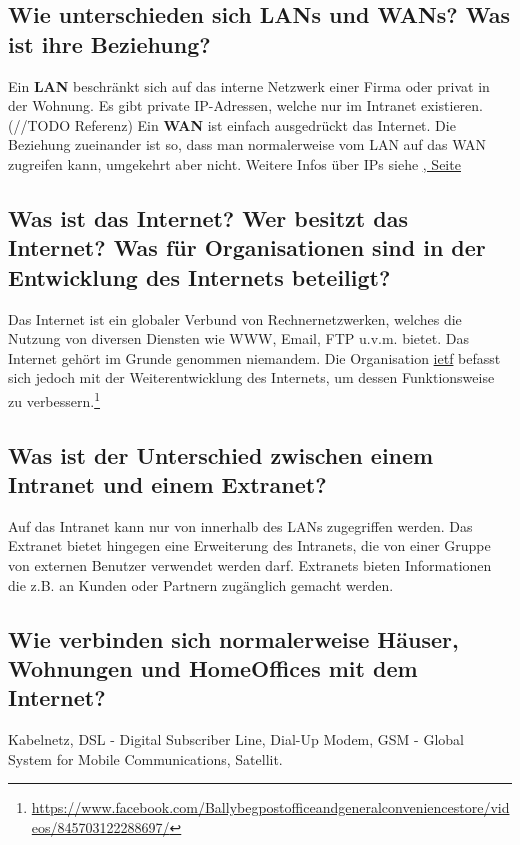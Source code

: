 \subsection*{Wie unterschieden sich LANs und WANs? Was ist ihre Beziehung?}
Ein \textbf{LAN} beschränkt sich auf das interne Netzwerk einer Firma oder privat in der Wohnung. Es gibt private IP-Adressen, welche nur im Intranet existieren. (//TODO Referenz) Ein \textbf{WAN} ist einfach ausgedrückt das Internet. Die Beziehung zueinander ist so, dass man normalerweise vom LAN auf das WAN zugreifen kann, umgekehrt aber nicht. Weitere Infos über IPs siehe \hyperref[part:sw0506]{\underline{, Seite \pageref{part:sw0506}}}


\subsection*{Was ist das Internet? Wer besitzt das Internet? Was für Organisationen sind in der Entwicklung des Internets beteiligt?}
Das Internet ist ein globaler Verbund von Rechnernetzwerken, welches die Nutzung von diversen Diensten wie WWW, Email, FTP u.v.m. bietet. Das Internet gehört im Grunde genommen niemandem. Die Organisation \underline{\acrshort{ietf}} befasst sich jedoch mit der Weiterentwicklung des Internets, um dessen Funktionsweise zu verbessern.\footnote{\url{https://www.facebook.com/Ballybegpostofficeandgeneralconveniencestore/videos/845703122288697/}}
\subsection*{Was ist der Unterschied zwischen einem Intranet und einem Extranet?}
Auf das Intranet kann nur von innerhalb des LANs zugegriffen werden. Das Extranet bietet hingegen eine Erweiterung des Intranets, die von einer Gruppe von externen Benutzer verwendet werden darf. Extranets bieten Informationen die z.B. an Kunden oder Partnern zugänglich gemacht werden.

\subsection*{Wie verbinden sich normalerweise Häuser, Wohnungen und HomeOffices mit dem Internet?}
Kabelnetz, DSL - Digital Subscriber Line, Dial-Up Modem, GSM - Global System for Mobile Communications, Satellit.

